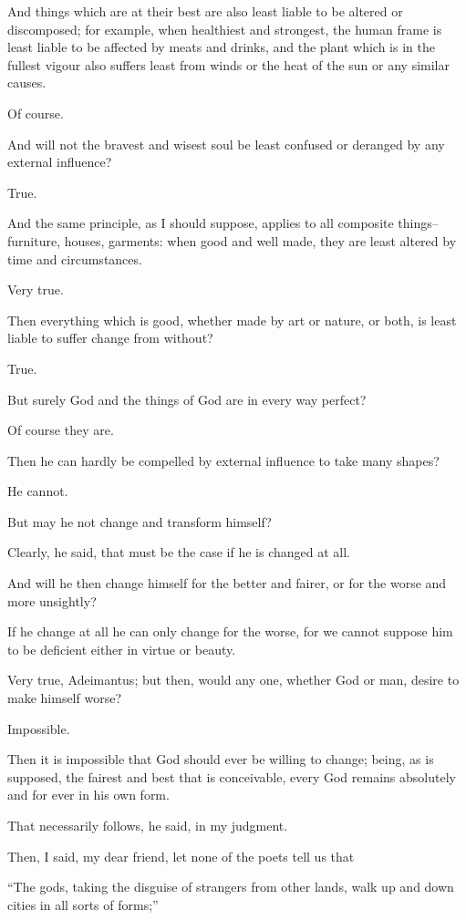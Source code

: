 And things which are at their best are also least liable to be altered
or discomposed; for example, when healthiest and strongest, the human
frame is least liable to be affected by meats and drinks, and the plant
which is in the fullest vigour also suffers least from winds or the heat
of the sun or any similar causes.

Of course.

And will not the bravest and wisest soul be least confused or deranged
by any external influence?

True.

And the same principle, as I should suppose, applies to all composite
things--furniture, houses, garments: when good and well made, they are
least altered by time and circumstances.

Very true.

Then everything which is good, whether made by art or nature, or both,
is least liable to suffer change from without?

True.

But surely God and the things of God are in every way perfect?

Of course they are.

Then he can hardly be compelled by external influence to take many
shapes?

He cannot.

But may he not change and transform himself?

Clearly, he said, that must be the case if he is changed at all.

And will he then change himself for the better and fairer, or for the
worse and more unsightly?

If he change at all he can only change for the worse, for we cannot
suppose him to be deficient either in virtue or beauty.

Very true, Adeimantus; but then, would any one, whether God or man,
desire to make himself worse?

Impossible.

Then it is impossible that God should ever be willing to change; being,
as is supposed, the fairest and best that is conceivable, every God
remains absolutely and for ever in his own form.

That necessarily follows, he said, in my judgment.

Then, I said, my dear friend, let none of the poets tell us that

``The gods, taking the disguise of strangers from other lands, walk up
and down cities in all sorts of forms;''

